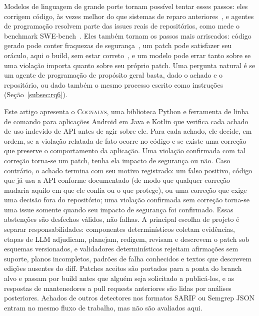 \documentclass[conference]{IEEEtran}
\newcommand{\system}{\textsc{Cognalys}}
\begin{document}
Modelos de linguagem de grande porte tornam possível tentar esses passos: eles corrigem código,
às vezes melhor do que sistemas de reparo
anteriores~\cite{xia2023apr,zhang2023apimisuse}, e agentes de programação resolvem parte das issues reais
de repositórios, como mede o benchmark
SWE-bench~\cite{jimenez2024swebench,yang2024sweagent}. Eles também tornam os passos mais arriscados: código gerado pode conter
fraquezas de segurança~\cite{pearce2022asleep}, um patch pode satisfazer seu oráculo, aqui o
build, sem estar correto~\cite{smith2015overfitting}, e um modelo pode
errar tanto sobre se uma violação importa quanto sobre seu próprio patch. Uma
pergunta natural é se um agente de programação de propósito geral basta, dado o
achado e o repositório, ou dado também o mesmo processo escrito como
instruções (Seção~\ref{subsec:rq6}).

Este artigo apresenta o \system, uma biblioteca Python e ferramenta de linha de comando para aplicações
Android em Java e Kotlin que verifica cada achado de uso indevido de API antes de
agir sobre ele. Para cada achado, ele decide, em ordem, se a
violação relatada de fato ocorre no código e se existe uma correção que preserve o
comportamento da aplicação. Uma violação confirmada com tal correção torna-se um patch,
tenha ela impacto de segurança ou não. Caso contrário, o achado termina com seu
motivo registrado: um falso positivo, código que já usa a API conforme documentado
(de modo que qualquer correção mudaria aquilo em que ele confia ou o que protege), ou uma correção que exige
uma decisão fora do repositório; uma violação confirmada sem correção torna-se
uma issue somente quando seu impacto de segurança foi confirmado. Essas abstenções são
desfechos válidos, não falhas. A principal escolha de projeto é separar
responsabilidades: componentes determinísticos coletam evidências, etapas de LLM
adjudicam, planejam, redigem, revisam e descrevem o patch sob esquemas
versionados, e validadores determinísticos rejeitam afirmações sem suporte, planos
incompletos, padrões de falha conhecidos e textos que descrevem edições ausentes do
diff. Patches aceitos são portados para a ponta do branch alvo e passam por build
antes que alguém seja solicitado a publicá-los, e as respostas de mantenedores a
pull requests anteriores são lidas por análises posteriores. Achados de outros detectores nos
formatos SARIF ou Semgrep JSON entram no mesmo fluxo de trabalho, mas não são avaliados
aqui.
\end{document}
